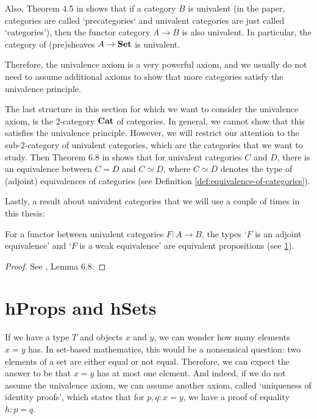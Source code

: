 Also, Theorem 4.5 in \cite{univalent-categories} shows that if a category $ B $ is univalent (in the paper, categories are called `precategories` and univalent categories are just called `categories'), then the functor category $ A \rightarrow B $ is also univalent. In particular, the category of (pre)sheaves $ A \to \mathbf{Set} $ is univalent.

Therefore, the univalence axiom is a very powerful axiom, and we usually do not need to assume additional axioms to show that more categories satisfy the univalence principle.

The last structure in this section for which we want to consider the univalence axiom, is the 2-category $ \mathbf{Cat} $ of categories. In general, we cannot show that this satisfies the univalence principle. However, we will restrict our attention to the sub-2-category of univalent categories, which are the categories that we want to study. Then Theorem 6.8 in \cite{univalent-categories} shows that for univalent categories $ C $ and $ D $, there is an equivalence between $ C = D $ and $ C \simeq D $, where $ C \simeq D $ denotes the type of (adjoint) equivalences of categories (see Definition \ref{def:equivalence-of-categories}).

Lastly, a result about univalent categories that we will use a couple of times in this thesis:
\begin{lemma}
  For a functor between univalent categories $ F: A \to B $, the types `$ F $ is an adjoint equivalence' and `$ F $ is a weak equivalence' are equivalent propositions (see \ref{sec:homotopy-props-sets}).
\end{lemma}
\begin{proof}
  See \cite{univalent-categories}, Lemma 6.8.
\end{proof}

\section{hProps and hSets}\label{sec:homotopy-props-sets}
If we have a type $ T $ and objects $ x $ and $ y $, we can wonder how many elements $ x = y $ has. In set-based mathematics, this would be a nonsensical question: two elements of a set are either equal or not equal. Therefore, we can expect the answer to be that $ x = y $ has at most one element. And indeed, if we do not assume the univalence axiom, we can assume another axiom, called `uniqueness of identity proofs', which states that for $ p, q: x = y $, we have a proof of equality $ h: p = q $.

